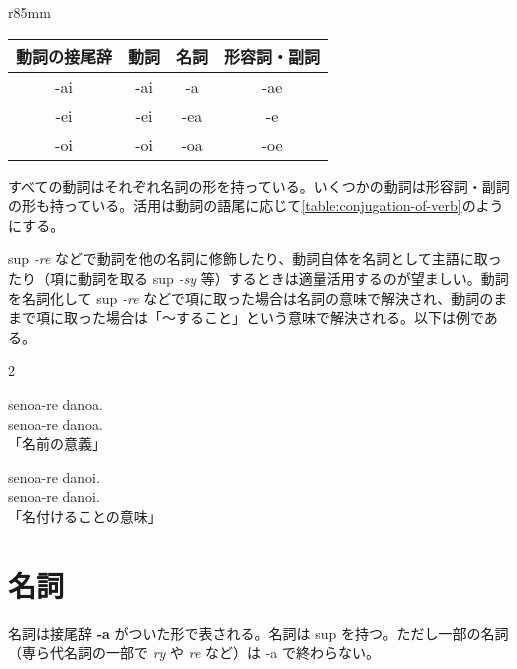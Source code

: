 \begin{wraptable}[8]{r}{85mm}
    \centering
    \caption{動詞の名詞・形容詞・副詞への活用}
    \label{table:conjugation-of-verb}
    \begin{tabular}{cccc}
        \toprule
        動詞の接尾辞 & 動詞 & 名詞 & 形容詞・副詞 \\
        \midrule
        -ai & -ai & -a  & -ae \\
        -ei & -ei & -ea & -e  \\
        -oi & -oi & -oa & -oe \\
        \bottomrule
    \end{tabular}
\end{wraptable}

すべての動詞はそれぞれ名詞の形を持っている。いくつかの動詞は形容詞・副詞の形も持っている。活用は動詞の語尾に応じて\cref{table:conjugation-of-verb}のようにする。

sup \emph{-re} などで動詞を他の名詞に修飾したり、動詞自体を名詞として主語に取ったり（項に動詞を取る sup \emph{-sy} 等）するときは適量活用するのが望ましい。動詞を名詞化して sup \emph{-re} などで項に取った場合は名詞の意味で解決され、動詞のままで項に取った場合は「～すること」という意味で解決される。以下は例である。

\begin{multicols}{2}
    \begin{pindent}
        \noindent
        senoa-re danoa. \\
        senoa-re danoa. \\
        「名前の意義」
    \end{pindent}

    \columnbreak

    \begin{pindent}
        senoa-re danoi. \\
        senoa-re danoi. \\
        「名付けることの意味」
        \noindent
    \end{pindent}
\end{multicols}

\section{名詞}

名詞は接尾辞 \textbf{-a} がついた形で表される。名詞は sup を持つ。ただし一部の名詞（専ら代名詞の一部で \emph{ry} や \emph{re} など）は -a で終わらない。

